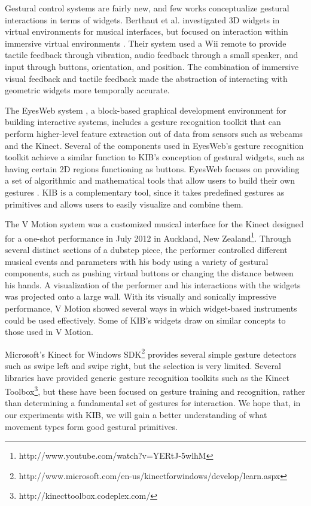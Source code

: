 \documentclass{nime-alternate}
\begin{document}
Gestural control systems are fairly new, and few works conceptualize gestural interactions in terms of widgets. Berthaut et al. investigated 3D widgets in virtual environments for musical
interfaces, but focused on interaction within immersive virtual environments \cite{berthaut2011interacting}. Their system used a Wii remote to provide tactile feedback through vibration,
audio feedback through a small speaker, and input through buttons, orientation, and position. The combination of immersive visual feedback and tactile feedback made the abstraction
of interacting with geometric widgets more temporally accurate.

The EyesWeb system \cite{camurri2000eyesweb}, a block-based graphical development environment for building
interactive systems, includes a gesture recognition toolkit that can perform higher-level
feature extraction out of data from sensors such as webcams and the Kinect. Several of the components
used in EyesWeb's gesture recognition toolkit achieve a similar function to KIB's conception of gestural widgets, such as
having certain 2D regions functioning as buttons. EyesWeb focuses on providing a set of algorithmic
and mathematical tools that allow users to build their own gestures \cite{gillian2011machine}. KIB is a complementary
tool, since it takes predefined gestures as primitives and allows users to easily visualize and combine them.

The V Motion system was a customized musical interface for the Kinect designed for a one-shot performance in July 2012
in Auckland, New Zealand\footnote{http://www.youtube.com/watch?v=YERtJ-5wlhM}. Through 
several distinct sections of a dubstep piece, the performer controlled different musical
events and parameters with his body using a variety of gestural components, such as pushing virtual buttons
or changing the distance between his hands. A visualization of the performer and his interactions with the widgets was
projected onto a large wall. With its visually and sonically impressive performance, V Motion showed several ways 
in which widget-based instruments could be used effectively. Some of KIB's widgets draw on similar concepts to those
used in V Motion.

Microsoft's Kinect for Windows SDK\footnote{http://www.microsoft.com/en-us/kinectforwindows/develop/learn.aspx} provides several simple gesture detectors such as swipe left and
swipe right, but the selection is very limited. Several libraries have provided generic gesture recognition toolkits such as the Kinect Toolbox\footnote{http://kinecttoolbox.codeplex.com/}, but these have been focused on gesture training and recognition, rather
than determining a fundamental set of gestures for interaction. We hope that, in our
experiments with KIB, we will gain a better understanding of what movement types form good gestural primitives.
\end{document}
